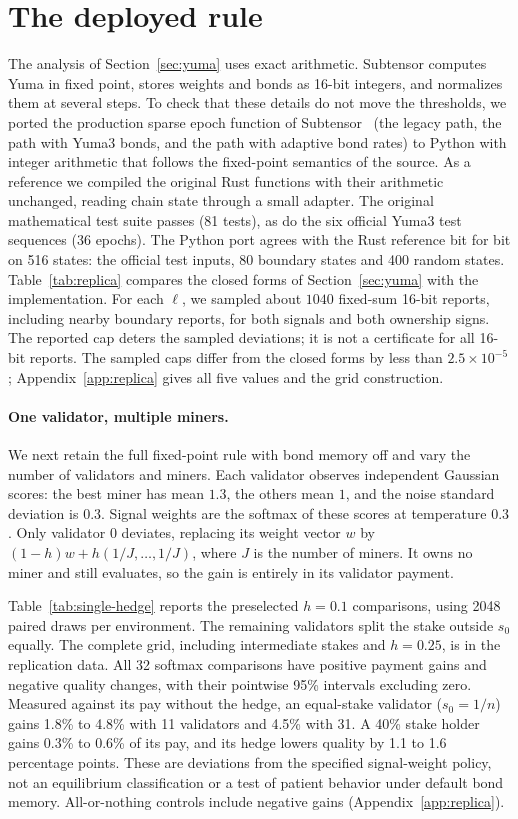 \documentclass[sigconf,anonymous,review]{acmart}
\numberwithin{equation}{section}
\begin{document}
\section{The deployed rule}
\label{sec:replica}

The analysis of Section~\ref{sec:yuma} uses exact arithmetic. Subtensor
computes Yuma in fixed point, stores weights and bonds as 16-bit integers, and
normalizes them at several steps. To check that these details do not move the
thresholds, we ported the production sparse epoch function of
Subtensor~\cite{subtensor2026} (the legacy path, the path with Yuma3 bonds, and
the path with adaptive bond rates) to Python with integer arithmetic that
follows the fixed-point semantics of the source. As a reference we compiled the
original Rust functions with their arithmetic unchanged, reading chain state
through a small adapter. The original
mathematical test suite passes (81 tests), as do the six official Yuma3 test
sequences (36 epochs). The Python port agrees with the Rust reference bit for
bit on 516 states: the official test inputs, 80 boundary states and 400 random
states. Table~\ref{tab:replica} compares the closed forms of
Section~\ref{sec:yuma} with the implementation. For each $\ell$, we sampled
about $1040$ fixed-sum 16-bit reports, including nearby boundary reports,
for both signals and both ownership signs. The reported cap deters the
sampled deviations; it is not a certificate for all 16-bit reports.
The sampled caps differ from the closed forms by less than
$2.5\times10^{-5}$; Appendix~\ref{app:replica} gives all five values and
the grid construction.

\paragraph{One validator, multiple miners.} We next retain the full
fixed-point rule with bond memory off and vary the number of validators
and miners. Each validator observes independent Gaussian scores: the
best miner has mean $1.3$, the others mean $1$, and the noise standard
deviation is $0.3$. Signal weights are the softmax of these scores at
temperature $0.3$. Only validator 0 deviates, replacing its weight vector
$w$ by $(1-h)w+h(1/J,\ldots,1/J)$, where $J$ is the number of miners.
It owns no miner and still evaluates, so the gain is entirely in its
validator payment.

Table~\ref{tab:single-hedge} reports the preselected $h=0.1$ comparisons,
using 2048 paired draws per environment. The remaining validators split
the stake outside $s_0$ equally. The complete grid, including intermediate
stakes and $h=0.25$, is in the replication data. All 32 softmax comparisons have
positive payment gains and negative quality changes, with their pointwise
95\% intervals excluding zero. Measured against its pay without the hedge,
an equal-stake validator ($s_0=1/n$) gains 1.8\% to 4.8\% with 11 validators
and 4.5\% with 31. A 40\% stake holder gains 0.3\% to 0.6\% of its pay, and
its hedge lowers quality by 1.1 to 1.6 percentage points. These are deviations from the specified signal-weight
policy, not an equilibrium classification or a test of patient behavior
under default bond memory. All-or-nothing controls include negative gains
(Appendix~\ref{app:replica}).
\end{document}
